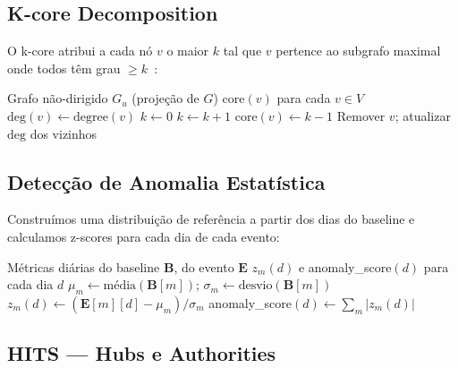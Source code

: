 \documentclass[12pt,a4paper]{article}
\begin{document}
\subsection{K-core Decomposition}

O k-core atribui a cada nó $v$ o maior $k$ tal que $v$ pertence ao subgrafo maximal onde todos têm grau $\geq k$~\cite{batagelj2003}:

\begin{algorithm}[H]
\caption{K-core Decomposition}
\begin{algorithmic}[1]
\Require Grafo não-dirigido $G_u$ (projeção de $G$)
\Ensure $\text{core}(v)$ para cada $v \in V$
 $\text{deg}(v) \gets \text{degree}(v)$ \EndFor
\State $k \gets 0$
  \State $k \gets k + 1$
    \State $\text{core}(v) \gets k - 1$
    \State Remover $v$; atualizar $\text{deg}$ dos vizinhos
  \EndWhile
\EndWhile
\end{algorithmic}
\end{algorithm}

\subsection{Detecção de Anomalia Estatística}

Construímos uma distribuição de referência a partir dos dias do baseline e calculamos z-scores para cada dia de cada evento:

\begin{algorithm}[H]
\caption{Detecção de Anomalia via Z-score}
\begin{algorithmic}[1]
\Require Métricas diárias do baseline $\mathbf{B}$, do evento $\mathbf{E}$
\Ensure $z_m(d)$ e anomaly\_score$(d)$ para cada dia $d$
  \State $\mu_m \gets \text{média}(\mathbf{B}[m])$; \quad $\sigma_m \gets \text{desvio}(\mathbf{B}[m])$
\EndFor
{}
    \State $z_m(d) \gets (\mathbf{E}[m][d] - \mu_m) / \sigma_m$
  \EndFor
  \State anomaly\_score$(d) \gets \sum_m |z_m(d)|$
\EndFor
\end{algorithmic}
\end{algorithm}

\subsection{HITS --- Hubs e Authorities}
\end{document}
